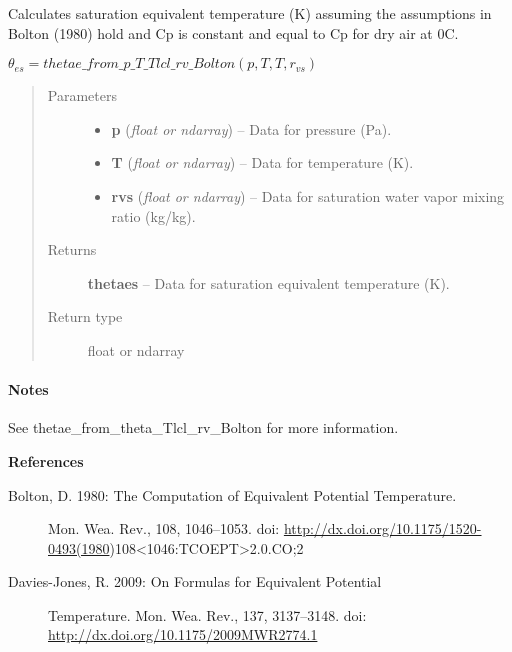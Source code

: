 \documentclass[letterpaper,10pt,english]{sphinxmanual}
\begin{document}

\begin{fulllineitems}
\label{atmos:atmos.equations.thetaes_from_p_T_rvs_Bolton}
Calculates saturation equivalent temperature (K) assuming the assumptions in
Bolton (1980) hold and Cp is constant and equal to Cp for dry air at 0C.

\(\theta_{es} = thetae\_from\_p\_T\_Tlcl\_rv\_Bolton(p, T, T, r_{vs})\)
\begin{quote}\begin{description}
\item[{Parameters}] \leavevmode\begin{itemize}
\item {} 
\textbf{p} (\emph{float or ndarray}) -- Data for pressure (Pa).

\item {} 
\textbf{T} (\emph{float or ndarray}) -- Data for temperature (K).

\item {} 
\textbf{rvs} (\emph{float or ndarray}) -- Data for saturation water vapor mixing ratio (kg/kg).

\end{itemize}

\item[{Returns}] \leavevmode
\textbf{thetaes} --
Data for saturation equivalent temperature (K).

\item[{Return type}] \leavevmode
float or ndarray

\end{description}\end{quote}
\paragraph{Notes}

See thetae\_from\_theta\_Tlcl\_rv\_Bolton for more information.

\textbf{References}
\begin{description}
\item[{Bolton, D. 1980: The Computation of Equivalent Potential Temperature.}] \leavevmode
Mon. Wea. Rev., 108, 1046–1053.
doi: \href{http://dx.doi.org/10.1175/1520-0493(1980}{http://dx.doi.org/10.1175/1520-0493(1980})108\textless{}1046:TCOEPT\textgreater{}2.0.CO;2

\item[{Davies-Jones, R. 2009: On Formulas for Equivalent Potential}] \leavevmode
Temperature. Mon. Wea. Rev., 137, 3137–3148.
doi: \href{http://dx.doi.org/10.1175/2009MWR2774.1}{http://dx.doi.org/10.1175/2009MWR2774.1}

\end{description}

\end{fulllineitems}
\end{document}

